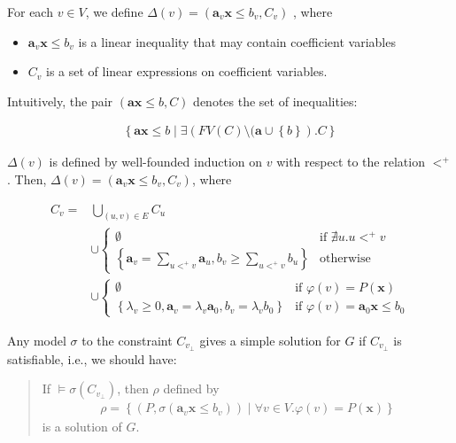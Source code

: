 \documentclass[a4paper,12pt]{article}
\begin{document}
For each $v \in V$, we define
$\Delta(v) = (\mathbf{a}_v \mathbf{x} \leq b_v, C_v)$
, where
\begin{itemize}
\item $\mathbf{a}_v \mathbf{x} \leq b_v$ is a linear inequality that
  may contain coefficient variables
\item $C_v$ is a set of linear expressions on coefficient variables.
\end{itemize}
Intuitively, the pair $(\mathbf{a} \mathbf{x} \leq b, C)$ denotes the
set of inequalities:

\begin{align*}
\left\lbrace
 \mathbf{a} \mathbf{x} \leq b \middle|
 \exists \left( FV(C)
  \setminus (\mathbf{a} \cup \left\lbrace b \right\rbrace
 \right). C
\right\rbrace
\end{align*}

$\Delta(v)$ is defined by well-founded induction on $v$ with respect
to the relation $<^+$. Then,
$\Delta(v) = \left( \mathbf{a}_v \mathbf{x} \leq b_v, C_v \right)$,
where

\begin{align*}
C_v = & \bigcup_{(u,v) \in E} C_u
\\
& \cup \begin{cases}
\emptyset
& \mbox{if } \nexists u. u <^+ v \\
\left\lbrace
 \mathbf{a}_v = \sum_{u <^+ v} \mathbf{a}_u,
 b_v \geq \sum_{u <^+ v} b_u
\right\rbrace
& \mbox{otherwise}
\end{cases}
\\
& \cup \begin{cases}
\emptyset
& \mbox{if } \varphi(v) = P(\mathbf{x}) \\
\left\lbrace
 \lambda_v \geq 0, \mathbf{a}_v = \lambda_v \mathbf{a}_0,
 b_v = \lambda_v b_0
\right\rbrace
& \mbox{if } \varphi(v) = \mathbf{a}_0 \mathbf{x} \leq b_0
\end{cases}
\end{align*}

Any model $\sigma$ to the constraint $C_{v_\bot}$ gives a simple
solution for $G$ if $C_{v_\bot}$ is satisfiable, i.e., we should have:

\begin{quote}
If $\models \sigma(C_{v_\bot})$, then $\rho$ defined by
\begin{align*}
 \rho = \left\lbrace
  \left( P, \sigma(\mathbf{a}_v \mathbf{x} \leq b_v) \right) \middle|
  \forall v \in V. \varphi(v) = P(\mathbf{x})
 \right\rbrace
\end{align*}
is a solution of $G$.
\end{quote}
\end{document}
